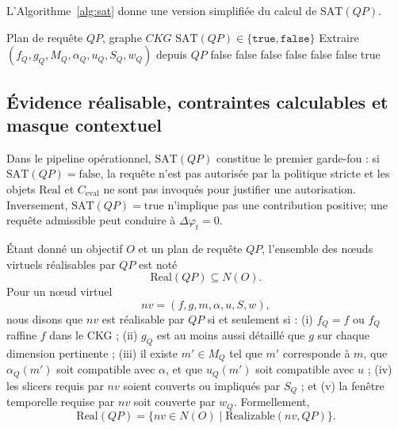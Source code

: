\documentclass[journal]{IEEEtran}
\begin{document}
L'Algorithme~\ref{alg:sat} donne une version simplifiée du calcul de $\mathrm{SAT}(QP)$.

\begin{algorithm}[!t]
\caption{Vérification de la validité contextuelle $\mathrm{SAT}(QP)$}
\label{alg:sat}
\begin{algorithmic}[1]
\REQUIRE Plan de requête $QP$, graphe $CKG$
\ENSURE $\mathrm{SAT}(QP)\in\{\texttt{true},\texttt{false}\}$
\STATE Extraire $(f_Q,g_Q,M_Q,\alpha_Q,u_Q,S_Q,w_Q)$ depuis $QP$
 \RETURN false \ENDIF
{} \RETURN false \ENDIF
{} \RETURN false \ENDIF
{} \RETURN false \ENDIF
{} \RETURN false \ENDIF
{} \RETURN false \ENDIF
\RETURN true
\end{algorithmic}
\end{algorithm}

\subsection{Évidence réalisable, contraintes calculables et masque contextuel}

Dans le pipeline opérationnel, $\mathrm{SAT}(QP)$ constitue le premier garde-fou : si $\mathrm{SAT}(QP)=\mathrm{false}$, la requête n'est pas autorisée par la politique stricte et les objets $\mathrm{Real}$ et $C_{\mathrm{eval}}$ ne sont pas invoqués pour justifier une autorisation. Inversement, $\mathrm{SAT}(QP)=\mathrm{true}$ n'implique pas une contribution positive; une requête admissible peut conduire à $\Delta\varphi_t=0$.

Étant donné un objectif $O$ et un plan de requête $QP$, l'ensemble des nœuds virtuels réalisables par $QP$ est noté
\[
\mathrm{Real}(QP)\subseteq N(O).
\]
Pour un nœud virtuel
\[
nv=(f,g,m,\alpha,u,S,w),
\]
nous disons que $nv$ est réalisable par $QP$ si et seulement si : (i) $f_Q=f$ ou $f_Q$ raffine $f$ dans le CKG ; (ii) $g_Q$ est au moins aussi détaillé que $g$ sur chaque dimension pertinente ; (iii) il existe $m'\in M_Q$ tel que $m'$ corresponde à $m$, que $\alpha_Q(m')$ soit compatible avec $\alpha$, et que $u_Q(m')$ soit compatible avec $u$ ; (iv) les slicers requis par $nv$ soient couverts ou impliqués par $S_Q$ ; et (v) la fenêtre temporelle requise par $nv$ soit couverte par $w_Q$. Formellement,
\[
\mathrm{Real}(QP)=\{nv\in N(O)\mid \mathrm{Realizable}(nv,QP)\}.
\]
\end{document}
